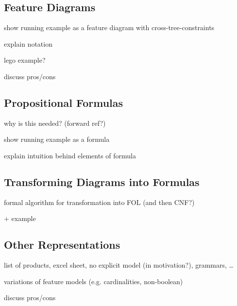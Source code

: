 \subsection{Feature Diagrams}

show running example as a feature diagram with cross-tree-constraints

explain notation

lego example?

discuss pros/cons

\subsection{Propositional Formulas}

why is this needed? (forward ref?)

show running example as a formula

explain intuition behind elements of formula

\subsection{Transforming Diagrams into Formulas}

formal algorithm for transformation into FOL (and then CNF?)

+ example

\subsection{Other Representations}

list of products, excel sheet, no explicit model (in motivation?), grammars, \dots

variations of feature models (e.g. cardinalities, non-boolean)

discuss pros/cons

